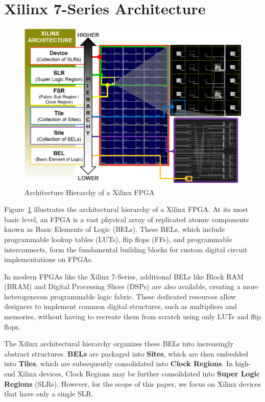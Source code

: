 \documentclass[twocolumn]{article}
\begin{document}
\section{Xilinx 7-Series Architecture}

    \begin{figure}
        \centering
        \includegraphics[width=\textwidth]{figures/hierarchy.png}
        \caption{Architecture Hierarchy of a Xilinx FPGA}
        \label{fig:hierarchy}
    \end{figure}

    Figure~\ref{fig:hierarchy} illustrates the architectural hierarchy of a Xilinx FPGA. 
    At its most basic level, an FPGA is a vast physical array of replicated atomic components known as Basic Elements of Logic (BELs). 
    These BELs, which include programmable lookup tables (LUTs), flip flops (FFs), and programmable interconnects, form the fundamental building blocks for custom digital circuit implementations on FPGAs. 

    In modern FPGAs like the Xilinx 7-Series, additional BELs like Block RAM (BRAM) and Digital Processing Slices (DSPs) are also available, creating a more heterogeneous programmable logic fabric. 
    These dedicated resources allow designers to implement common digital structures, such as multipliers and memories, without having to recreate them from scratch using only LUTs and flip flops. 

    The Xilinx architectural hierarchy organizes these BELs into increasingly abstract structures. 
    \textbf{BELs} are packaged into \textbf{Sites}, which are then embedded into \textbf{Tiles}, which are subsequently consolidated into \textbf{Clock Regions}. 
    In high-end Xilinx devices, Clock Regions may be further consolidated into \textbf{Super Logic Regions} (SLRs). 
    However, for the scope of this paper, we focus on Xilinx devices that have only a single SLR. 
\end{document}
